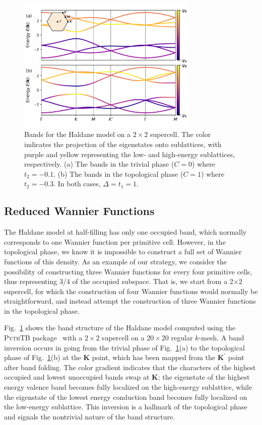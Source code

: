 \documentclass[galley,aps,pra,10pt,amsmath,amssymb,
    superscriptaddress,nofootinbib,longbibliography]{revtex4-2}
\newcounter{comm}
\newcommand{\code}[1]{\textsc{#1}}
\begin{document}
\begin{figure}[t!]
\begin{center}
\includegraphics[width=3.4in]{fig1.png}
\end{center}
\vspace{-10mm}
\caption{Bands for the Haldane model on a $2\times 2$ supercell. The color indicates the projection of the eigenstates onto sublattices, with purple and yellow representing the low- and high-energy sublattices, respectively. (a) The bands in the trivial phase ($C=0$) where $t_2 = -0.1$. (b) The bands in the topological phase ($C=1$) where $t_2 = -0.3$. In both cases, $\Delta = t_1 = 1$.}
\label{FIG1}
\end{figure}


\subsection{Reduced Wannier Functions}
\label{ss:dfcntWF} 


 The Haldane model at half-filling has only one occupied band, which normally corresponds to one Wannier function per primitive cell. However, in the topological phase, we know it is impossible to construct a full set of Wannier functions of this density. As an example of our strategy, we consider the possibility of constructing three Wannier functions for every four primitive cells, thus representing 3/4 of the occupied subspace. That is, we start from a 2$\times$2 supercell, for which the construction of four Wannier functions would normally be straightforward, and instead attempt the construction of three Wannier functions in the topological phase.

Fig.~\ref{FIG1} shows the band structure of the Haldane model computed using the \code{PythTB} package~\cite{pythtb} with a $2\times 2$ supercell on a $20\times 20$ regular $k$-mesh. A band inversion occurs in going from the trivial phase of Fig.~\ref{FIG1}(a) to the topological phase of Fig.~\ref{FIG1}(b) at the $\mathbf{K}$ point, which has been mapped from the $\mathbf{K}^{\prime}$ point after band folding. The color gradient indicates that the characters of the highest occupied and lowest unoccupied bands swap at $\mathbf{K}$; the eigenstate of the highest energy valence band becomes fully localized on the high-energy sublattice, while the eigenstate of the lowest energy conduction band becomes fully localized on the low-energy sublattice. This inversion is a hallmark of the topological phase and signals the nontrivial nature of the band structure.
\end{document}
